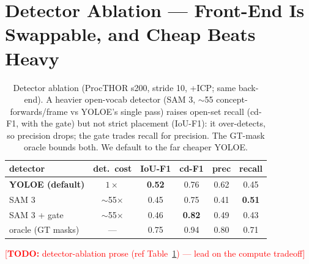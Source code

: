 \documentclass[conference]{IEEEtran}
\newcommand{\todo}[1]{\textcolor{red}{[\textbf{TODO:} #1]}}
\begin{document}
\section{Detector Ablation --- Front-End Is Swappable, and Cheap Beats Heavy}
\label{app:detector}
\begin{table}[H]
  \centering
  \caption{Detector ablation (ProcTHOR s200, stride 10, +ICP; same back-end).
  A heavier open-vocab detector (SAM 3, $\sim$55 concept-forwards/frame vs
  YOLOE's single pass) raises open-set recall (cd-F1, with the gate) but not
  strict placement (IoU-F1): it over-detects, so precision drops; the gate
  trades recall for precision. The GT-mask oracle bounds both. We default to
  the far cheaper YOLOE.}
  \label{tab:detector}
  \setlength{\tabcolsep}{4pt}
  \footnotesize
  \begin{tabular}{lccccc}
    \toprule
    detector & det.\ cost & IoU-F1 & cd-F1 & prec & recall \\
    \midrule
    \textbf{YOLOE (default)}   & $1\times$ & \textbf{0.52} & 0.76 & 0.62 & 0.45 \\
    SAM 3                      & $\sim$55$\times$ & 0.45 & 0.75 & 0.41 & \textbf{0.51} \\
    SAM 3 + gate               & $\sim$55$\times$ & 0.46 & \textbf{0.82} & 0.49 & 0.43 \\
    oracle (GT masks)          & --- & 0.75 & 0.94 & 0.80 & 0.71 \\
    \bottomrule
  \end{tabular}
\end{table}

\todo{detector-ablation prose (ref Table~\ref{tab:detector}) --- lead on the compute tradeoff}



\end{document}
